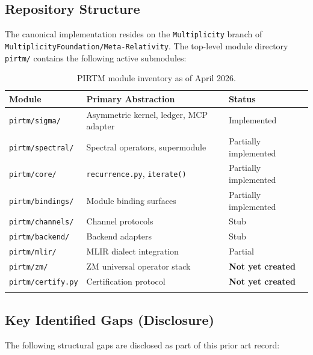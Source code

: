 \documentclass[12pt,letterpaper]{article}
\theoremstyle{definition}
\theoremstyle{remark}
\begin{document}
\subsection{Repository Structure}

The canonical implementation resides on the \texttt{Multiplicity} branch of
\texttt{MultiplicityFoundation/Meta-Relativity}. The top-level module
directory \texttt{pirtm/} contains the following active submodules:

\begin{longtable}{lll}
\toprule
\textbf{Module} & \textbf{Primary Abstraction} & \textbf{Status} \\
\midrule
\texttt{pirtm/sigma/} & Asymmetric kernel, ledger, MCP adapter & Implemented \\
\texttt{pirtm/spectral/} & Spectral operators, supermodule & Partially implemented \\
\texttt{pirtm/core/} & \texttt{recurrence.py}, \texttt{iterate()} & Partially implemented \\
\texttt{pirtm/bindings/} & Module binding surfaces & Partially implemented \\
\texttt{pirtm/channels/} & Channel protocols & Stub \\
\texttt{pirtm/backend/} & Backend adapters & Stub \\
\texttt{pirtm/mlir/} & MLIR dialect integration & Partial \\
\texttt{pirtm/zm/} & ZM universal operator stack & \textbf{Not yet created} \\
\texttt{pirtm/certify.py} & Certification protocol & \textbf{Not yet created} \\
\bottomrule
\caption{PIRTM module inventory as of April 2026.}
\end{longtable}

\subsection{Key Identified Gaps (Disclosure)}

The following structural gaps are disclosed as part of this prior art record:
\end{document}
